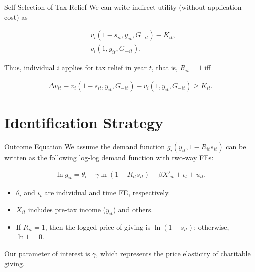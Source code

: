 \documentclass[
  ignorenonframetext,
  aspectratio=169,
]{beamer}
\providecommand{\tightlist}{%
  \setlength{\itemsep}{0pt}\setlength{\parskip}{0pt}}
\begin{document}
\begin{frame}{Self-Selection of Tax Relief}
\protect\hypertarget{self-selection-of-tax-relief}{}
We can write indirect utility (without application cost) as

\begin{align}
  &v_i(1 - s_{it}, y_{it}, G_{-it}) - K_{it},  \\
  &v_i(1, y_{it}, G_{-it}).
\end{align}

Thus, individual \(i\) applies for tax relief in year \(t\),
that is, \(R_{it} = 1\) iff

\begin{align}
  \Delta v_{it} \equiv
  v_i(1 - s_{it}, y_{it}, G_{-it}) - v_i(1, y_{it}, G_{-it})
  \ge K_{it}.
\end{align}
\end{frame}

\hypertarget{identification-strategy}{%
\section{Identification Strategy}\label{identification-strategy}}

\begin{frame}{Outcome Equation}
\protect\hypertarget{outcome-equation}{}
We assume the demand function \(g_i(y_{it}, 1 - R_{it} s_{it})\) can be written as the following log-log demand function with two-way FEs:

\begin{align}
  \ln g_{it} = \theta_i + \gamma \ln(1 - R_{it}s_{it}) + \beta X'_{it} + \iota_t + u_{it}.
\end{align}

\begin{itemize}
\tightlist
\item
  \(\theta_i\) and \(\iota_t\) are individual and time FE, respectively.
\item
  \(X_{it}\) includes pre-tax income (\(y_{it}\)) and others.
\item
  If \(R_{it} = 1\), then the logged price of giving is \(\ln(1 - s_{it})\); otherwise, \(\ln 1 = 0\).
\end{itemize}

Our parameter of interest is \(\gamma\), which represents the price elasticity of charitable giving.
\end{frame}
\end{document}
